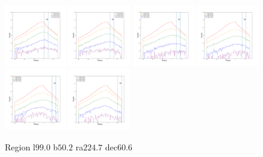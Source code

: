 \documentclass[12pt,prd]{article}
\begin{document}
\begin{figure}[h!]
\includegraphics[width=0.24\textwidth]{../figures/scanning_plotsgaiascan_l99_0_b50_2_ra224_7_dec60_6_npy_12.pdf}
\includegraphics[width=0.24\textwidth]{../figures/scanning_plotsgaiascan_l99_0_b50_2_ra224_7_dec60_6_npy_13.pdf}
\includegraphics[width=0.24\textwidth]{../figures/scanning_plotsgaiascan_l99_0_b50_2_ra224_7_dec60_6_npy_14.pdf}
\includegraphics[width=0.24\textwidth]{../figures/scanning_plotsgaiascan_l99_0_b50_2_ra224_7_dec60_6_npy_15.pdf}
\includegraphics[width=0.24\textwidth]{../figures/scanning_plotsgaiascan_l99_0_b50_2_ra224_7_dec60_6_npy_16.pdf}
\includegraphics[width=0.24\textwidth]{../figures/scanning_plotsgaiascan_l99_0_b50_2_ra224_7_dec60_6_npy_17.pdf}
\caption{Region l$99.0$ b$50.2$ ra$224.7$ dec$60.6$}
\end{figure}
\end{document}
